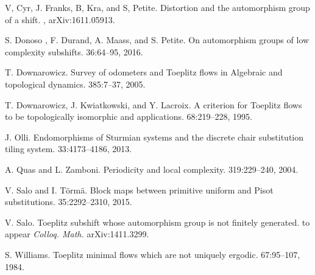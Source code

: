 \documentclass{daj}
\theoremstyle{plain}
\theoremstyle{definition}
\begin{document}
\begin{thebibliography}{99}
 V, Cyr, J. Franks, B, Kra, and S, Petite.
\newblock Distortion and the automorphism group of a shift.
, { arXiv:1611.05913}.

 S. Donoso , F. Durand, A. Maass, and S. Petite.
\newblock On automorphism groups of low complexity subshifts. 
  36:64--95, 2016. 

 T. Downarowicz.
\newblock Survey of odometers and Toeplitz flows in Algebraic and topological dynamics.
 {385}:7--37, 2005.

 T. Downarowicz, J. Kwiatkowski, and Y. Lacroix.
\newblock A criterion for Toeplitz flows to be topologically isomorphic and applications.
 68:219--228, 1995.

 J. Olli.
\newblock Endomorphisms of Sturmian systems and the discrete chair substitution tiling system.
 {33}:4173--4186, 2013.

 A. Quas and L. Zamboni.
\newblock Periodicity and local complexity.
 {319}:229--240, 2004. 	


 V. Salo and I. T\"orm\"a.
\newblock Block maps between primitive uniform and Pisot substitutions.
 {35}:2292--2310, 2015.

 V. Salo.
\newblock Toeplitz subshift whose automorphism group is not finitely generated.
\newblock to appear {\em  Colloq. Math.}  {arXiv:1411.3299}. 

 S. Williams.
\newblock Toeplitz minimal flows which are not uniquely ergodic.
 {67}:95--107, 1984. 		
	
	
	

\end{thebibliography}
\end{document}
